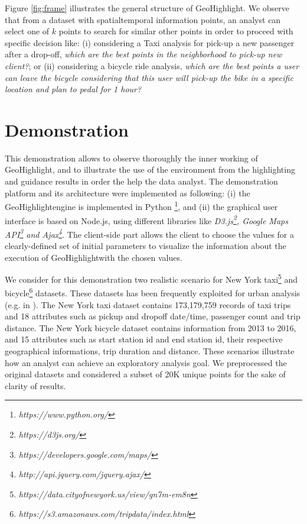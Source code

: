 \documentclass[conference]{IEEEtran}
\newcommand{\sys}{{\sc GeoHighlight}}
\begin{document}
Figure \ref{fig:frame} illustrates the general structure of \sys. We observe that from a dataset with spatialtemporal information points, an analyst can select one of $k$ points to search for similar other points in order to proceed with specific decision like: (i) considering a Taxi analysis for pick-up a new passenger after a drop-off, \textit{which are the best points in the neighborhood to pick-up  new client?}; or (ii) considering a bicycle ride analysis, \textit{which are the best points a user can leave the bicycle considering that this user will pick-up the bike in a specific location and plan to pedal for 1 hour?} 


%

\vspace{-5pt}
\section{Demonstration}

This demonstration allows to observe thoroughly the inner working of \sys, and to illustrate the use of the environment from the highlighting and guidance results in order the help the data analyst. The demonstration platform and its architecture were implemented as following: (i) the \sys engine is implemented in Python \footnote{\it https://www.python.org/}, and (ii) the graphical user interface is based on Node.js, using different libraries like \textit{D3.js\footnote{\it https://d3js.org/}, Google Maps API\footnote{\it https://developers.google.com/maps/} and Ajax\footnote{\it http://api.jquery.com/jquery.ajax/}}.  The client-side part allows the client to choose the values for a clearly-defined set of initial parameters to visualize the information about the execution of \sys with the chosen values. 


 We consider for this demonstration two realistic scenario for New York taxi\footnote{\it https://data.cityofnewyork.us/view/gn7m-em8n} and bicycle\footnote{\it https://s3.amazonaws.com/tripdata/index.html} datasets. These datasets has been frequently exploited for urban analysis
(e.g. in \cite{DBLP:journals/debu/FreireCVZ16}).
The  New York taxi dataset contains 173,179,759 records of taxi trips and 18 attributes such as pickup and dropoff date/time, passenger count and trip distance. The New York bicycle dataset contains information from 2013 to 2016, and 15 attributes such as start station id and end station id, their respective geographical informations, trip duration and distance.
These scenarios illustrate how an analyst can achieve an exploratory analysis goal. We preprocessed the original datasets and considered a subset of 20K unique points for the sake of clarity of results.
\end{document}
